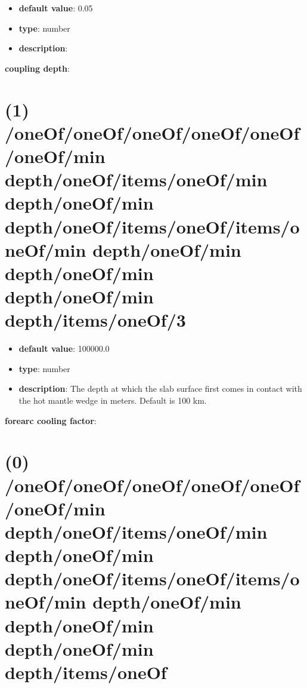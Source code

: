 \begin{itemize}[leftmargin=5em]\item {\bf default value}: 0.05
\item {\bf type}: number
\item {\bf description}: 
\end{itemize}\item {\bf coupling depth}: \section{(1) /oneOf/oneOf/oneOf/oneOf/oneOf/oneOf/min depth/oneOf/items/oneOf/min depth/oneOf/min depth/oneOf/items/oneOf/items/oneOf/min depth/oneOf/min depth/oneOf/min depth/oneOf/min depth/items/oneOf/3}
\begin{itemize}[leftmargin=1em]\item {\bf default value}: 100000.0
\item {\bf type}: number
\item {\bf description}: The depth at which the slab surface first comes in contact with the hot mantle wedge in meters. Default is 100 km.
\end{itemize}\item {\bf forearc cooling factor}: \section{(0) /oneOf/oneOf/oneOf/oneOf/oneOf/oneOf/min depth/oneOf/items/oneOf/min depth/oneOf/min depth/oneOf/items/oneOf/items/oneOf/min depth/oneOf/min depth/oneOf/min depth/oneOf/min depth/items/oneOf}

